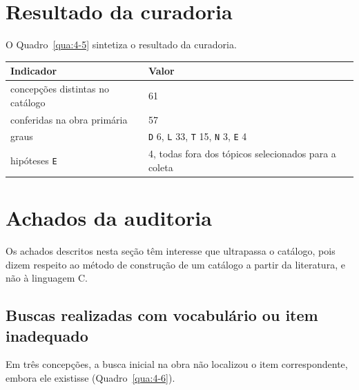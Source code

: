 \section{Resultado da curadoria}

O Quadro~\ref{qua:4-5} sintetiza o resultado da curadoria.

\begin{quadro}[htbp]
\caption{Resultado da curadoria}\label{qua:4-5}
\footnotesize
\begin{tabularx}{\textwidth}{|X|X|}
\hline
\textbf{Indicador} & \textbf{Valor} \\ \hline
concepções distintas no catálogo & 61 \\ \hline
conferidas na obra primária & 57 \\ \hline
graus & \texttt{D} 6, \texttt{L} 33, \texttt{T} 15, \texttt{N} 3, \texttt{E} 4 \\ \hline
hipóteses \texttt{E} & 4, todas fora dos tópicos selecionados para a coleta \\ \hline
\end{tabularx}
\end{quadro}

\section{Achados da auditoria}

Os achados descritos nesta seção têm interesse que ultrapassa o catálogo, pois dizem respeito ao método de construção de um catálogo a partir da literatura, e não à linguagem C.

\subsection{Buscas realizadas com vocabulário ou item inadequado}

Em três concepções, a busca inicial na obra não localizou o item correspondente, embora ele existisse (Quadro~\ref{qua:4-6}).

